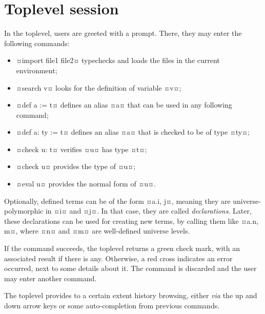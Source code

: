 \documentclass[twocolumn]{article}
\begin{document}
\section{Toplevel session}
In the toplevel, users are greeted with a prompt. There, they may enter the
following commands:
\begin{itemize}
	\item ¤import file1 file2¤ typechecks
		and loads the files in the current environment;
	\item ¤search v¤ looks for the definition of variable ¤v¤;
	\item ¤def a := t¤
		defines an alias ¤a¤ that can be used in any following command;
	\item ¤def a: ty := t¤ defines an alias ¤a¤ that is checked to
		be of type ¤ty¤;
	\item ¤check u: t¤ verifies ¤u¤ has type ¤t¤;
  \item ¤check u¤ provides the type of ¤u¤;
  \item ¤eval u¤ provides the normal form of ¤u¤.
\end{itemize}

Optionally, defined terms can be of the form ¤a.{i, j}¤, meaning they are
universe-polymorphic in ¤i¤ and ¤j¤. In that case, they are called
\emph{declarations}. Later, these declarations can be used for creating new
terms, by calling them like ¤a.{n, m}¤, where ¤n¤ and ¤m¤ are well-defined
universe levels.

If the command succeeds, the toplevel returns a green check mark, with an
associated result if there is any. Otherwise, a red cross indicates an error
occurred, next to some details about it. The command is discarded and the user
may enter another command.

The toplevel provides to a certain extent history browsing, either \emph{via}
the up and down arrow keys or some auto-completion from previous commands.
\end{document}
